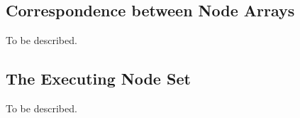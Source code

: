 \subsection{Correspondence between Node Arrays}

To be described.

\subsection{The Executing Node Set}

To be described.
